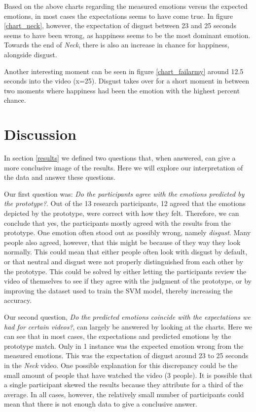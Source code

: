 \documentclass[sigconf]{acmart}
\begin{document}
Based on the above charts regarding the measured emotions versus the expected emotions, in most cases the
expectations seems to have come true. In figure \ref{chart_neck}, however, the expectation of disgust between
23 and 25 seconds seems to have been wrong, as happiness seems to be the most dominant emotion. Towards the end
of \emph{Neck}, there is also an increase in chance for happiness, alongside disgust.

Another interesting moment can be seen in figure \ref{chart_failarmy} around 12.5 seconds into the video (x=25).
Disgust takes over for a short moment in between two moments where happiness had been the emotion with the
highest percent chance.


\section{Discussion}
In section \ref{results} we defined two questions that, when answered, can give a more conclusive image of the
results. Here we will explore our interpretation of the data and answer these questions.

Our first question was: \emph{Do the participants agree with the emotions predicted by the prototype?}.
Out of the 13 research participants, 12 agreed that the emotions depicted by the prototype, were correct with
how they felt. Therefore, we can conclude that yes, the participants mostly agreed with the results from the
prototype. One emotion often stood out as possibly wrong, namely \emph{disgust}. Many people also agreed,
however, that this might be because of they way they look normally. This could mean that either people often
look with disgust by default, or that neutral and disgust were not properly distinguished from each other by
the prototype. This could be solved by either letting the participants review the video of themselves to see
if they agree with the judgment of the prototype, or by improving the dataset used to train the SVM model,
thereby increasing the accuracy.

Our second question, \emph{Do the predicted emotions coincide with the expectations we had for certain videos?},
can largely be answered by looking at the charts. Here we can see that in most cases, the expectations and
predicted emotions by the prototype match. Only in 1 instance was the expected emotion wrong from the measured
emotions. This was the expectation of disgust around 23 to 25 seconds in the \emph{Neck} video. One possible
explanation for this discrepancy could be the small amount of people that have watched the video (3 people).
It is possible that a single participant skewed the results because they attribute for a third of the average.
In all cases, however, the relatively small number of participants could mean that there is not enough data to
give a conclusive answer.
\end{document}
